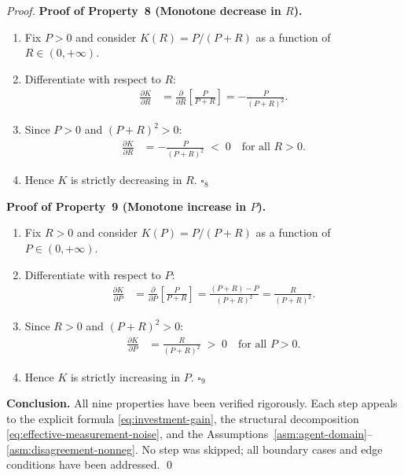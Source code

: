 \documentclass[12pt,openany]{book}
\numberwithin{equation}{chapter}
\theoremstyle{plain}
\theoremstyle{definition}
\theoremstyle{remark}
\begin{document}
\begin{proof}
\medskip
\noindent\textbf{Proof of Property~8
(Monotone decrease in $R$).}
\begin{enumerate}
  \item Fix $P > 0$ and consider $K(R) = P/(P+R)$
        as a function of $R \in (0,+\infty)$.
  \item Differentiate with respect to $R$:
        \begin{align}
          \frac{\partial K}{\partial R}
          &= \frac{\partial}{\partial R}
             \left[\frac{P}{P + R}\right]
           = -\frac{P}{(P + R)^2}.
          \label{eq:proof8-deriv}
        \end{align}
  \item Since $P > 0$ and $(P+R)^2 > 0$:
        \begin{align}
          \frac{\partial K}{\partial R}
          &= -\frac{P}{(P + R)^2}
          \;<\; 0
          \quad \text{for all } R > 0.
          \label{eq:proof8-sign}
        \end{align}
  \item Hence $K$ is strictly decreasing in $R$.
        $\square_8$
\end{enumerate}

\medskip
\noindent\textbf{Proof of Property~9
(Monotone increase in $P$).}
\begin{enumerate}
  \item Fix $R > 0$ and consider $K(P) = P/(P+R)$
        as a function of $P \in (0,+\infty)$.
  \item Differentiate with respect to $P$:
        \begin{align}
          \frac{\partial K}{\partial P}
          &= \frac{\partial}{\partial P}
             \left[\frac{P}{P + R}\right]
           = \frac{(P+R) - P}{(P+R)^2}
           = \frac{R}{(P+R)^2}.
          \label{eq:proof9-deriv}
        \end{align}
  \item Since $R > 0$ and $(P+R)^2 > 0$:
        \begin{align}
          \frac{\partial K}{\partial P}
          &= \frac{R}{(P+R)^2}
          \;>\; 0
          \quad \text{for all } P > 0.
          \label{eq:proof9-sign}
        \end{align}
  \item Hence $K$ is strictly increasing in $P$.
        $\square_9$
\end{enumerate}

\medskip
\noindent\textbf{Conclusion.}
All nine properties have been verified rigorously.
Each step appeals to the explicit formula
\eqref{eq:investment-gain}, the structural decomposition
\eqref{eq:effective-measurement-noise}, and the
Assumptions~\ref{asm:agent-domain}--\ref{asm:disagreement-nonneg}.
No step was skipped; all boundary cases and edge conditions
have been addressed.
\qed
\end{proof}
\end{document}
